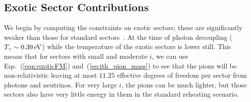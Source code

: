 \documentclass[nofootinbib,twocolumn,preprintnumbers]{revtex4-1}
\begin{document}

\subsection{Exotic Sector Contributions}



We begin by computing the constraints on exotic sectors; these are significantly weaker than those for standard sectors~\cite{Arkani-Hamed:2016rle}. 
At the time of photon decoupling ($T_\gamma \sim 0.39 \,{\rm eV}$) while the temperature of the exotic sectors is lower still. This means that for sectors with small and moderate $i$, we can use Eqs.~(\ref{eqn:exoticFM}) and~(\ref{eq:ith_pion_mass}) to see that the pions will be non-relativistic  leaving at most $11.25$ effective degrees of freedom per sector from photons and neutrinos.  For very large $i$, the pions can be much lighter, but those sectors also have very little energy in them in the standard reheating scenario. 
\end{document}
